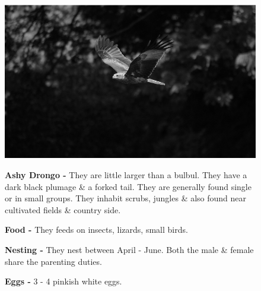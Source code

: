 \begin{figure}[H]
\begin{center}
\includegraphics{figure/Land_birds/01_pariah_kite/pariah-kite.eps}
\end{center}
\medskip
\noindent
{\bf Ashy Drongo -} They are little larger than a bulbul. They have a dark black plumage \& a forked tail. They are generally found single or in small groups. They inhabit scrubs, jungles \& also found near cultivated fields \& country side.

\medskip
{\bf Food -} They feeds on insects, lizards, small birds.

{\bf Nesting -} They nest between April - June. Both the male \& female share the parenting duties.

{\bf Eggs -} 3 - 4 pinkish white eggs.
\end{figure}

\vfill\eject

~\phantom{a}
\vfill

